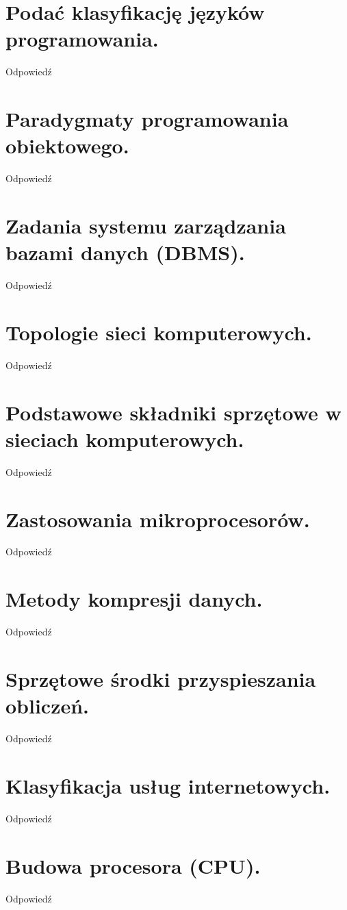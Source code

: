 \documentclass[12pt,a4paper]{article}
\begin{document}
	\section{Podać klasyfikację języków programowania.}
	Odpowiedź

	\section{Paradygmaty programowania obiektowego.}
	Odpowiedź

	\section{Zadania systemu zarządzania bazami danych (DBMS).}
	Odpowiedź

	\section{Topologie sieci komputerowych.}
	Odpowiedź

	\section{Podstawowe składniki sprzętowe w sieciach komputerowych.}
	Odpowiedź

	\section{Zastosowania mikroprocesorów.}
	Odpowiedź

	\section{Metody kompresji danych.}
	Odpowiedź

	\section{Sprzętowe środki przyspieszania obliczeń.}
	Odpowiedź

	\section{Klasyfikacja usług internetowych.}
	Odpowiedź

	\section{Budowa procesora (CPU).}
	Odpowiedź
\end{document}
